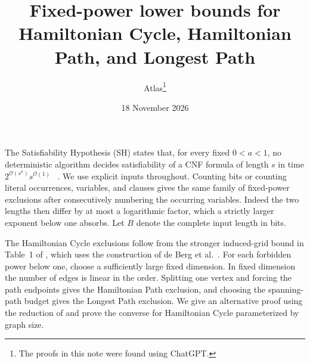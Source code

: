 \documentclass[11pt]{article}
\title{Fixed-power lower bounds for Hamiltonian Cycle, Hamiltonian Path, and Longest Path}
\author{Atlas\thanks{The proofs in this note were found using ChatGPT.}}
\date{18 November 2026}
\begin{document}
\maketitle

The Satisfiability Hypothesis (SH) states that, for every fixed
\(0<a<1\), no deterministic algorithm decides satisfiability of a
CNF formula of length \(s\) in time \(2^{\mathcal O(s^a)}s^{\mathcal O(1)}\)
~\cite{sh}. We use explicit inputs throughout. Counting bits or counting
literal occurrences, variables, and clauses gives the same family of
fixed-power exclusions after consecutively numbering the occurring
variables. Indeed the two lengths then differ by at most a logarithmic
factor, which a strictly larger exponent below one absorbs.
Let \(B\) denote the complete input length in bits.

The Hamiltonian Cycle exclusions follow from the stronger induced-grid
bound in Table~1 of \cite{sh}, which uses the construction of
de Berg et al.~\cite[Theorem~4.7]{grid}. For each forbidden power below
one, choose a sufficiently large fixed dimension. In fixed dimension
the number of edges is linear in the order. Splitting one vertex and
forcing the path endpoints gives the Hamiltonian Path exclusion, and
choosing the spanning-path budget gives the Longest Path exclusion.
We give an alternative proof using the reduction of \cite{ipz} and
prove the converse for Hamiltonian Cycle parameterized by graph size.
\end{document}
